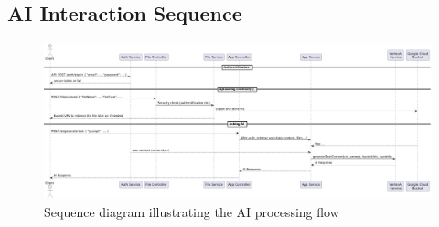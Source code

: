 \subsection*{AI Interaction Sequence}

\begin{figure}
    \centering
    \includegraphics[width=\textheight]{nest/ai-sequence.png}
    \caption{Sequence diagram illustrating the AI processing flow}
    \label{fig:ai-sequence}
\end{figure}
